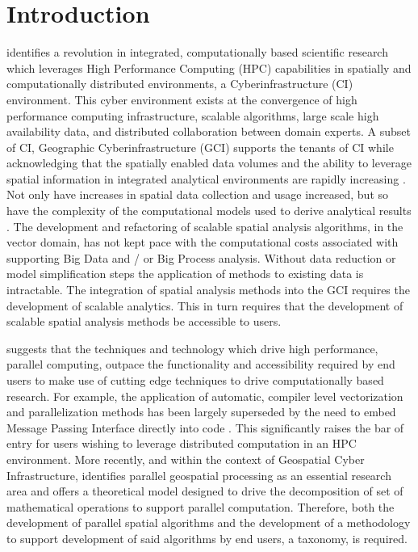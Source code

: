 \chapter{Introduction}
\cite{Atkins2003} identifies a revolution in integrated, computationally based scientific research which leverages High Performance Computing (HPC) capabilities in spatially and computationally distributed environments, a Cyberinfrastructure (CI) environment.  This cyber environment exists at the convergence of high performance computing infrastructure, scalable algorithms, large scale high availability data, and distributed collaboration between domain experts.  A subset of CI, Geographic Cyberinfrastructure (GCI) supports the tenants of CI while acknowledging that the spatially enabled data volumes and the ability to leverage spatial information in integrated analytical environments are rapidly increasing \citep{Yang2010}.  Not only have increases in spatial data collection and usage increased, but so have the complexity of the computational models used to derive analytical results \citep{Anselin2012, Yang2008, Yang2009, Yang2010}.  The development and refactoring of scalable spatial analysis algorithms, in the vector domain, has not kept pace with the computational costs associated with supporting Big Data and / or Big Process analysis.  Without data reduction or model simplification steps the application of methods to existing data is intractable.  The integration of spatial analysis methods into the GCI requires the development of scalable analytics.  This in turn requires that the development of scalable spatial analysis methods be accessible to users.

\cite{Atkins2003} suggests that the techniques and technology which drive high performance, parallel computing, outpace the functionality and accessibility required by end users to make use of cutting edge techniques to drive computationally based research.  For example, the application of automatic, compiler level vectorization and parallelization methods has been largely superseded by the need to embed Message Passing Interface directly into code \citep{Atkins2003}.  This significantly raises the bar of entry for users wishing to leverage distributed computation in an HPC environment. More recently, and within the context of Geospatial Cyber Infrastructure, \cite{Wang2009} identifies parallel geospatial processing as an essential research area and offers a theoretical model designed to drive the decomposition of set of mathematical operations to support parallel computation.  Therefore, both the development of parallel spatial algorithms and the development of a methodology to support development of said algorithms by end users, a taxonomy,  is required.

